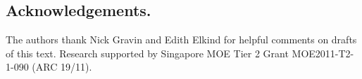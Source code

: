 \documentclass[runningheads,a4paper]{llncs}
\begin{document}
\subsection*{Acknowledgements.}
The authors thank Nick Gravin and Edith Elkind
for helpful comments on drafts of this text.
Research supported by Singapore MOE Tier 2 Grant MOE2011-T2-1-090 (ARC 19/11). 



%
\end{document}
